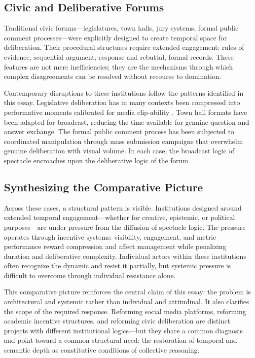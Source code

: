 \documentclass[11pt]{article}
\begin{document}
\subsection{Civic and Deliberative Forums}

Traditional civic forums---legislatures, town halls, jury systems, formal public comment processes---were explicitly designed to create temporal space for deliberation. Their procedural structures require extended engagement: rules of evidence, sequential argument, response and rebuttal, formal records. These features are not mere inefficiencies; they are the mechanisms through which complex disagreements can be resolved without recourse to domination.

Contemporary disruptions to these institutions follow the patterns identified in this essay. Legislative deliberation has in many contexts been compressed into performative moments calibrated for media clip-ability \citep{Mutz2015}. Town hall formats have been adapted for broadcast, reducing the time available for genuine question-and-answer exchange. The formal public comment process has been subjected to coordinated manipulation through mass submission campaigns that overwhelm genuine deliberation with visual volume. In each case, the broadcast logic of spectacle encroaches upon the deliberative logic of the forum.

\subsection{Synthesizing the Comparative Picture}

Across these cases, a structural pattern is visible. Institutions designed around extended temporal engagement---whether for creative, epistemic, or political purposes---are under pressure from the diffusion of spectacle logic. The pressure operates through incentive systems: visibility, engagement, and metric performance reward compression and affect management while penalizing duration and deliberative complexity. Individual actors within these institutions often recognize the dynamic and resist it partially, but systemic pressure is difficult to overcome through individual resistance alone.

This comparative picture reinforces the central claim of this essay: the problem is architectural and systemic rather than individual and attitudinal. It also clarifies the scope of the required response. Reforming social media platforms, reforming academic incentive structures, and reforming civic deliberation are distinct projects with different institutional logics---but they share a common diagnosis and point toward a common structural need: the restoration of temporal and semantic depth as constitutive conditions of collective reasoning.
\end{document}
